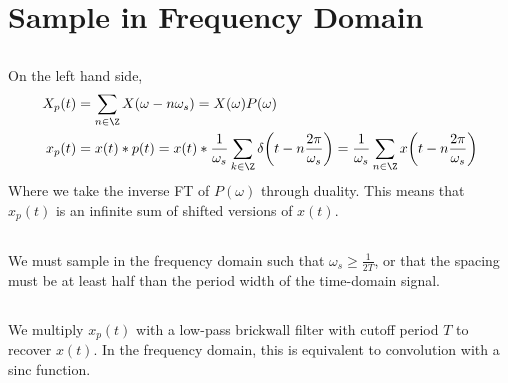 \documentclass{article}
\begin{document}
\section{Sample in Frequency Domain}

\subsection{}

\begin{center}
\end{center}

\subsection{}

On the left hand side,
\begin{align}
    X_p(t) &= \sum_{n \in \Z} X(\omega - n\omega_s) = X(\omega) P(\omega)\\
    x_p(t) &= x(t) \ast p(t) = x(t) \ast \frac{1}{\omega_s} \sum_{k \in \Z} \delta\qty(t - n\frac{2\pi}{\omega_s}) = \frac{1}{\omega_s} \sum_{n \in \Z} x\qty(t - n\frac{2\pi}{\omega_s})
\end{align}
Where we take the inverse FT of \(P(\omega)\) through duality.
This means that \(x_p(t)\) is an infinite sum of shifted versions of \(x(t)\).

\subsection{}

We must sample in the frequency domain such that \(\omega_s \geqslant \frac{1}{2T}\), or that the spacing must be at least half than the period width of the time-domain signal.

\subsection{}

We multiply \(x_p(t)\) with a low-pass brickwall filter with cutoff period \(T\) to recover \(x(t)\).
In the frequency domain, this is equivalent to convolution with a sinc function.
\end{document}
